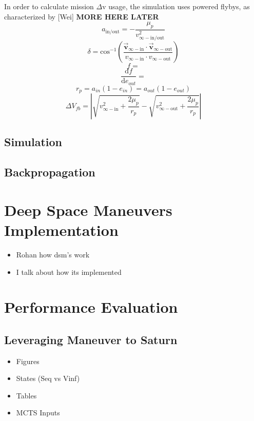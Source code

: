 \documentclass[letterpaper, preprint, paper,11pt]{AAS}	%
\begin{document}
In order to calculate mission $\Delta \text{v}$ usage, the simulation uses powered flybys, as characterized by [Wei] \textbf{MORE HERE LATER}
\[ a_\text{in/out} = -\frac{\mu_p}{v^2_{\infty-\text{in/out}}} \]
\[ \delta = \text{cos}^{-1}\left(\frac{ \vec{\textbf{v}}_{\infty-\text{in}} \cdot \vec{\textbf{v}}_{\infty-\text{out}} }{ v_{\infty-\text{in}} \cdot v_{\infty-\text{out}} }\right) \]
\[ f =  \]
\[ \frac{\text{d}f}{\text{d}e_{out}} =  \]
\[ r_p = a_{in}(1 - e_{in}) = a_{out}(1 - e_{out}) \]
\[ \Delta V_{fb} = \left| \sqrt{v^2_{\infty-\text{in}} + \frac{2\mu_p}{r_p}} - \sqrt{v^2_{\infty-\text{out}} + \frac{2\mu_p}{r_p}} \right| \]

\subsection{Simulation}



\subsection{Backpropagation}

\section{Deep Space Maneuvers Implementation}

\begin{itemize}
    \item Rohan how dsm's work
    
    \item I talk about how its implemented
\end{itemize}

\section{Performance Evaluation}

\subsection{Leveraging Maneuver to Saturn}


\begin{itemize}
    \item Figures
        \item States (Seq vs Vinf)
    \item Tables
        \item MCTS Inputs
\end{itemize}
\end{document}
